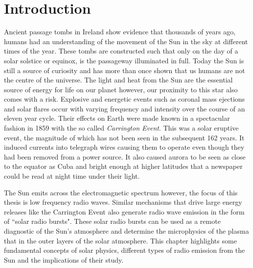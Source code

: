 \doublespacing
\chapter{Introduction}
\label{chap:intro}
Ancient passage tombs in Ireland show evidence that thousands of years ago, humans had an understanding of the movement of the Sun in the sky at different times of the year. These tombs are constructed such that only on the day of a solar solstice or equinox, is the passageway illuminated in full. Today the Sun is still a source of curiosity and has more than once shown that us humans are not the centre of the universe. The light and heat from the Sun are the essential source of energy for life on our planet however, our proximity to this star also comes with a risk. Explosive and energetic events such as coronal mass ejections and solar flares occur with varying frequency and intensity over the course of an eleven year cycle. Their effects on Earth were made known in a spectacular fashion in 1859 with the so called \textit{Carrington Event}. This was a solar eruptive event, the magnitude of which has not been seen in the subsequent 162 years. It induced currents into telegraph wires causing them to operate even though they had been removed from a power source. It also caused aurora to be seen as close to the equator as Cuba and bright enough at higher latitudes that a newspaper could be read at night time under their light. 

The Sun emits across the electromagnetic spectrum however, the focus of this thesis is low frequency radio waves. Similar mechanisms that drive large energy releases like the Carrington Event also generate radio wave emission in the form of ``solar radio bursts". These solar radio bursts can be used as a remote diagnostic of the Sun's atmosphere and determine the microphysics of the plasma that in the outer layers of the solar atmosphere.
This chapter highlights some fundamental concepts of solar physics, different types of radio emission from the Sun and the implications of their study.

